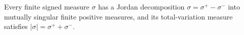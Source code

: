 Every finite signed measure \(\sigma\) has a Jordan decomposition \(\sigma=\sigma^+-\sigma^-\) into mutually singular finite positive measures, and its total-variation measure satisfies \(|\sigma|=\sigma^++\sigma^-\).